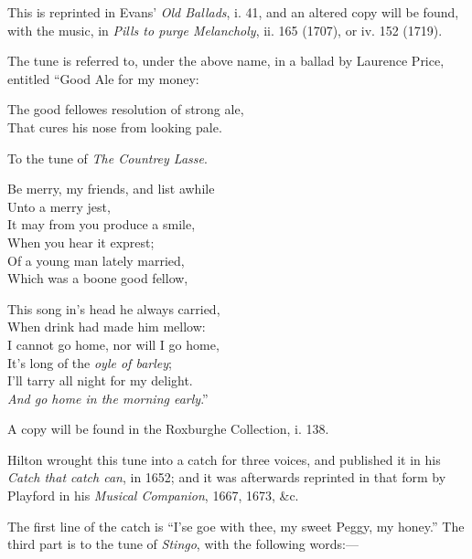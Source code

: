 This is reprinted in Evans’ \textit{Old Ballads}, i. 41, and an altered copy will be found,
with the music, in \textit{ Pills to purge Melancholy}, ii. 165 (1707), or iv. 152 (1719).

The tune is referred to, under the above name, in a ballad by Laurence Price,
entitled “Good Ale for my money:
\settowidth{\versewidth}{The good fellowes resolution of strong ale,}
\begin{scverse}
The good fellowes resolution of strong ale,\\
That cures his nose from looking pale.
\end{scverse}
To the tune of \textit{The Countrey Lasse}.

\settowidth{\versewidth}{Be merry, my friends, and list awhile}
\begin{dcverse}\begin{altverse}
Be merry, my friends, and list awhile\\
Unto a merry jest,\\
It may from you produce a smile,\\
When you hear it exprest;\\
Of a young man lately married,\\
Which was a boone good fellow,
\end{altverse}

\begin{altverse}
This song in’s head he always carried,\\
When drink had made him mellow:\\
I cannot go home, nor will I go home,\\
It’s long of the \textit{oyle of barley};\\
I’ll tarry all night for my delight.\\
\textit{And go home in the morning early}.”
\end{altverse}
\end{dcverse}

A copy will be found in the Roxburghe Collection, i. 138.

Hilton wrought this tune into a catch for three voices, and published it in his
\textit{Catch that catch can}, in 1652; and it was afterwards reprinted in that form by
Playford in his \textit{Musical Companion}, 1667, 1673, \&c.

The first line of the catch is “I’se goe with thee, my sweet Peggy, my honey.”
The third part is to the tune of \textit{Stingo}, with the following words:—

